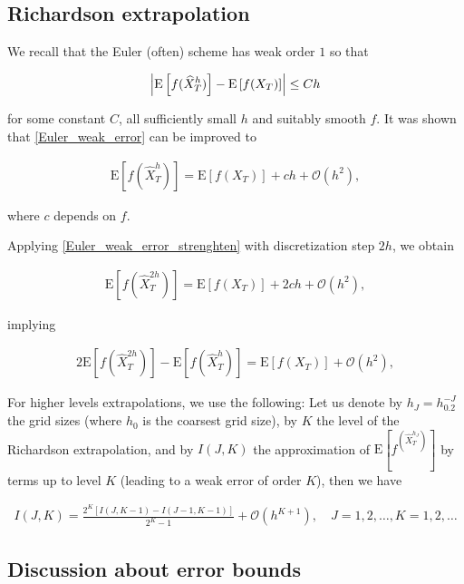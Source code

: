\documentclass[11pt]{article}
\newcommand{\expt}[1]{\mathrm{E}\left[#1\right]}
\newcommand{\COMMA}{,}
\newcommand{\Ordo}[1]{{\mathcal{O}}\left(#1\right)}
\begin{document}
\subsection{Richardson extrapolation}\label{sec:Richardson extrapolation}


We  recall that the Euler (often) scheme has weak order $1$ so that

\begin{align}\label{Euler_weak_error}
	\abs{\expt{f(\hat{X}_T^h)}-\expt{f(X_T)} }  \leq C h
\end{align}

for some constant $C$, all sufficiently small $h$ and suitably smooth $f$. It was shown that \ref{Euler_weak_error} can be improved to


\begin{align}\label{Euler_weak_error_strenghten}
	\expt{f(\hat{X}_T^h)}= \expt{f(X_T)} + c h +\Ordo{h^2} \COMMA
\end{align}


where $c$ depends on $f$. 

Applying \ref{Euler_weak_error_strenghten} with discretization step $2h$, we  obtain

\begin{align}\label{Euler_weak_error_strenghten_2h}
	\expt{f(\hat{X}_T^{2h})}= \expt{f(X_T)} + 2 c h +\Ordo{h^2} \COMMA
\end{align}

implying

\begin{align}\label{Richardson_extrapol}
	2 \expt{f(\hat{X}_T^{2h})}- \expt{f(\hat{X}_T^{h})} =\expt{f(X_T)} + \Ordo{h^2} \COMMA
\end{align}

For higher levels extrapolations, we use the following: Let us denote by $h_J=h_0.2^{-J}$ the grid sizes (where $h_0$ is the coarsest grid size), by $K$ the level of the Richardson extrapolation, and by $I(J,K)$ the approximation of $\expt{f^(\hat{X}_T^{h_J})}$ by terms up to level $K$ (leading to a weak error of order $K$), then we have

\begin{align}
I(J,K)=\frac{2^K\left[I(J,K-1)-I(J-1,K-1)\right]}{2^K-1} +\Ordo{h^{K+1}},\quad J=1,2,\dots, K=1,2,\dots
\end{align}




\subsection{Discussion about error bounds}\label{sec: Discussion about error bounds}
\end{document}
